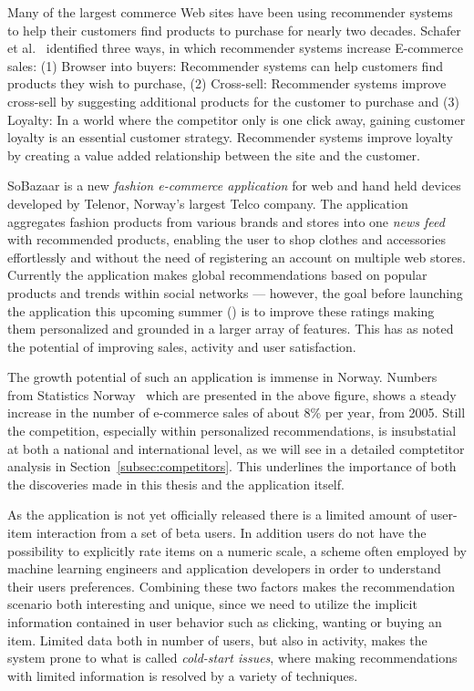 Many of the largest commerce Web sites have been using recommender systems to
help their customers find products to purchase for nearly two decades.
Schafer et al.~\cite{Schafer1999} identified three ways, in which recommender
systems increase E-commerce sales: (1) Browser into buyers: Recommender systems
can help customers find products they wish to purchase, (2) Cross-sell:
Recommender systems improve cross-sell by suggesting additional products for
the customer to purchase and (3) Loyalty: In a world where the competitor only
is one click away, gaining customer loyalty is an essential customer strategy.
Recommender systems improve loyalty by creating a value added relationship
between the site and the customer.

SoBazaar is a new \textit{fashion e-commerce application} for web and hand held
devices developed by Telenor, Norway's largest Telco company. The application
aggregates fashion products from various brands and stores into one \emph{news
feed} with recommended products, enabling the user to shop clothes and
accessories effortlessly and without the need of registering an account on
multiple web stores. Currently the application makes global recommendations
based on popular products and trends within social networks --- however, the goal
before launching the application this upcoming summer (\the\year) is to improve
these ratings making them personalized and grounded in a larger array of
features. This has as noted the potential of improving sales, activity and user
satisfaction.

\ecommercenorway{}

The growth potential of such an application is immense in Norway. Numbers from
Statistics Norway~\cite{statisticsNorway} which are presented in the above
figure, shows a steady increase in the number of e-commerce sales of about 8\%
per year, from 2005. Still the competition, especially within personalized
recommendations, is insubstatial at both a national and international level, as
we will see in a detailed comptetitor analysis in
Section~\ref{subsec:competitors}. This underlines the importance of both the
discoveries made in this thesis and the application itself.

As the application is not yet officially released there is a limited amount of
user-item interaction from a set of beta users. In addition users do not have
the possibility to explicitly rate items on a numeric scale, a scheme often
employed by machine learning engineers and application developers in order to
understand their users preferences. Combining these two factors makes the
recommendation scenario both interesting and unique, since we need to utilize
the implicit information contained in user behavior such as clicking, wanting
or buying an item. Limited data both in number of users, but also in activity,
makes the system prone to what is called \textit{cold-start issues}, where
making recommendations with limited information is resolved by a variety of
techniques.

